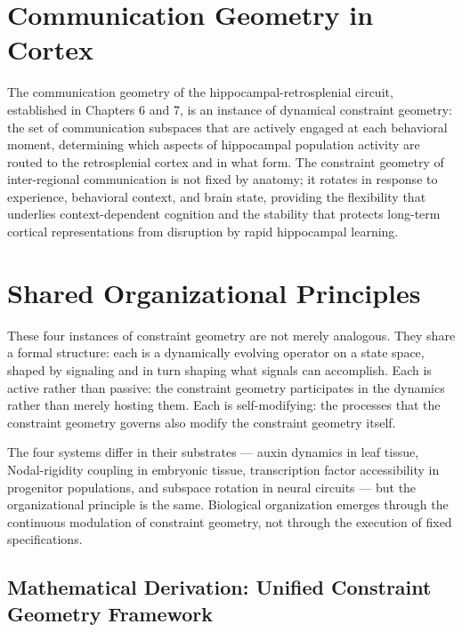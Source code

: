 \documentclass[12pt, a4paper, openany]{book}
\theoremstyle{definition}
\theoremstyle{remark}
\begin{document}
\section{Communication Geometry in Cortex}

The communication geometry of the hippocampal-retrosplenial circuit, established in Chapters 6 and 7, is an instance of dynamical constraint geometry: the set of communication subspaces that are actively engaged at each behavioral moment, determining which aspects of hippocampal population activity are routed to the retrosplenial cortex and in what form. The constraint geometry of inter-regional communication is not fixed by anatomy; it rotates in response to experience, behavioral context, and brain state, providing the flexibility that underlies context-dependent cognition and the stability that protects long-term cortical representations from disruption by rapid hippocampal learning.

\section{Shared Organizational Principles}

These four instances of constraint geometry are not merely analogous. They share a formal structure: each is a dynamically evolving operator on a state space, shaped by signaling and in turn shaping what signals can accomplish. Each is active rather than passive: the constraint geometry participates in the dynamics rather than merely hosting them. Each is self-modifying: the processes that the constraint geometry governs also modify the constraint geometry itself.

The four systems differ in their substrates — auxin dynamics in leaf tissue, Nodal-rigidity coupling in embryonic tissue, transcription factor accessibility in progenitor populations, and subspace rotation in neural circuits — but the organizational principle is the same. Biological organization emerges through the continuous modulation of constraint geometry, not through the execution of fixed specifications.

\subsection*{Mathematical Derivation: Unified Constraint Geometry Framework}
\end{document}
